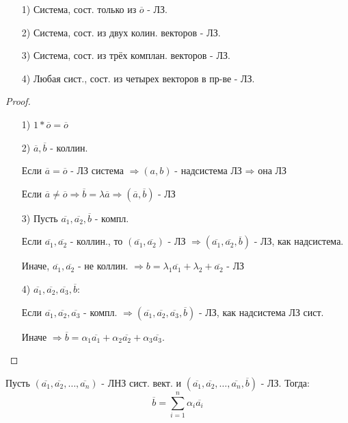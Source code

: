 \begin{consequence}
\begin{itemize}
    \item [1) ] Система, сост. только из $\overline{o}$ - ЛЗ.
    \item [2) ] Система, сост. из двух колин. векторов - ЛЗ.
    \item [3) ] Система, сост. из трёх комплан. векторов - ЛЗ.
    \item [4) ] Любая сист., сост. из четырех векторов в пр-ве - ЛЗ.
\end{itemize}
\end{consequence}
\begin{proof}
\begin{itemize}
    \item [1) ] $1 * \overline{o} = \overline{o}$
    \item [2) ] $\overline{a}, \overline{b}$ - коллин. 
       
        Если $\overline{a} = \overline{o}$ - ЛЗ система $\Rightarrow (a, b) \text{- надсистема ЛЗ $\Rightarrow$ она ЛЗ}$

        Если $\overline{a} \neq \overline{o} \Rightarrow \overline{b} = \lambda \overline{a} \Rightarrow (\overline{a}, \overline{b}) \text{ - ЛЗ}$ 
    \item [3) ] Пусть $\overline{a_1}, \overline{a_2}, \overline{b}$ - компл. 

        Если $\overline{a_1}, \overline{a_2}$ - коллин., то $(\overline{a_1}, \overline{a_2})$ - ЛЗ $\Rightarrow (\overline{a_1}, \overline{a_2}, \overline{b})$ - ЛЗ, как надсистема.

        Иначе, $\overline{a_1}, \overline{a_2}$ - не коллин. $\Rightarrow b = \lambda_1 \overline{a_1} + \lambda_2 + \overline{a_2}$ - ЛЗ

    \item [4) ] $\overline{a_1}, \overline{a_2}, \overline{a_3}, \overline{b}$:

        Если $\overline{a_1}, \overline{a_2}, \overline{a_3}$ - компл. $\Rightarrow (\overline{a_1}, \overline{a_2}, \overline{a_3}, \overline{b})$ - ЛЗ, как надсистема ЛЗ сист.

        Иначе $\Rightarrow \overline{b} = \alpha_1 \overline{a_1} + \alpha_2 \overline{a_2} + \alpha_3\overline{a_3}$.
\end{itemize}
\end{proof}
\begin{statement}
    Пусть $(\overline{a_1}, \overline{a_2}, \ldots, \overline{a_n})$ - ЛНЗ сист. вект. и $(\overline{a_1}, \overline{a_2}, \ldots, \overline{a_n}, \overline{b})$ - ЛЗ. Тогда:
    \[
    \overline{b} = \sum_{i = 1}^{n} \alpha_i \overline{a_i}
    \] 
\end{statement}
